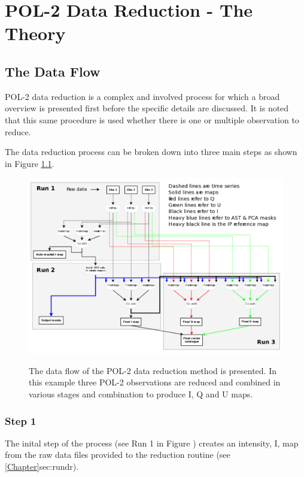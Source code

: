 \chapter{POL-2 Data Reduction - The Theory}
\label{sec:dr}
\section{The Data Flow}

POL-2 data reduction is a complex and involved process for which a broad overview is presented first before
the specific details are discussed. It is noted that this same procedure is used whether there is one or 
multiple observation to reduce.

The data reduction process can be broken down into three main steps as shown in Figure \ref{fig:pol2drflow}.

\begin{figure}[t!]
\begin{center}
\includegraphics[width=0.95\linewidth]{pol2-dr-flow.png}
\label{fig:pol2drflow}
\caption [POL-2 Data Flow]{
  \small The data flow of the POL-2 data reduction method is
  presented. In this example three POL-2 observations are
  reduced and combined in various stages and combination to
  produce I, Q and U maps.
}
\end{center}
\end{figure}


\subsection*{Step 1}

The inital step of the process (see Run 1 in Figure \cite{fig:pol2drflow}) creates 
an intensity, I, map from the raw data files provided to the reduction routine (see \cref{Chapter}{sec:rundr}). 


